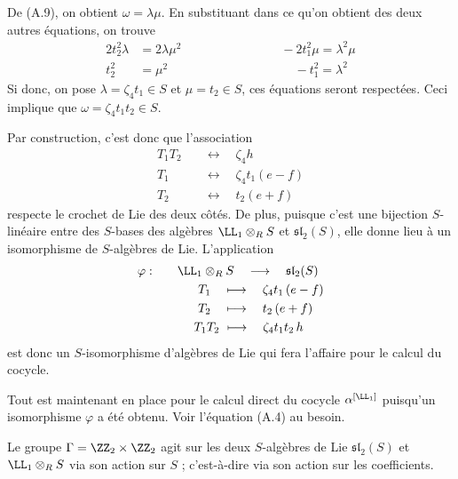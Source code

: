 De (A.9), on obtient $\omega = \lambda \mu$. En substituant dans ce qu'on obtient des deux autres équations, on trouve
\begin{align*}
2t_2^2 \lambda &= 2 \lambda \mu^2 \qquad \qquad \qquad \qquad -2t_1^2\mu = \lambda^2 \mu\\
t_2^2 &= \mu^2 \qquad \qquad \qquad \qquad \qquad \,-t_1^2 = \lambda^2
\end{align*}
Si donc, on pose $\lambda = \zeta_4t_1 \in S$ et $\mu = t_2 \in S$, ces équations seront respectées. Ceci implique que $\omega = \zeta_4t_1t_2 \in S$. 

Par construction, c'est donc que l'association 
\begin{align*}
T_1T_2 \quad &\longleftrightarrow \quad \zeta_4 h\\
T_1 \quad &\longleftrightarrow \quad \zeta_4 t_1 (e - f)\\
T_2 \quad &\longleftrightarrow \quad t_2 (e + f)
\end{align*}
respecte le crochet de Lie des deux côtés. De plus, puisque c'est une bijection $S$-linéaire entre des $S$-bases des algèbres $\LL_1 \otimes_R S$ et $\mathfrak{sl}_2(S)$, elle donne lieu à un isomorphisme de $S$-algèbres de Lie. L'application 
\begin{align*}
\varphi :  &\qquad \LL_1 \otimes_R S \quad \longrightarrow \quad \mathfrak{sl}_2(S) \\
& \qquad \quad \,\,\,\, T_1 \,\,\,\,\,\, \longmapsto \quad \zeta_4t_1\,(e-f) \\
& \qquad \quad \,\,\,\, T_2 \,\,\,\,\,\, \longmapsto \quad t_2\,(e+f) \\
& \qquad \quad \,\, T_1T_2 \,\, \longmapsto \quad \zeta_4t_1t_2\,h \\
\end{align*}
est donc un $S$-isomorphisme d'algèbres de Lie qui fera l'affaire pour le calcul du cocycle. 




\begin{annexeRem} Tout est maintenant en place pour le calcul direct du cocycle $\alpha^{[\LL_1]}$ puisqu'un isomorphisme $\varphi$ a été obtenu. Voir l'équation (A.4) au besoin. 
\end{annexeRem}

\begin{annexeRem} Le groupe $\Gamma = \ZZ_2 \times \ZZ_2$ agit sur les deux $S$-algèbres de Lie $\mathfrak{sl}_2(S)$ et $\LL_1 \otimes_R S$ via son action sur $S$ ; c'est-à-dire via son action sur les coefficients. 
\end{annexeRem}

